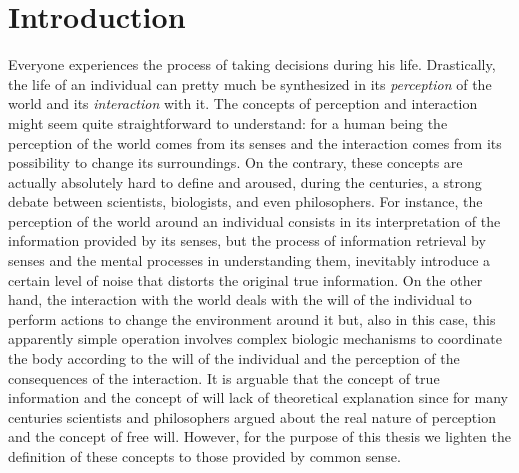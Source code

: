 \chapter{Introduction}
Everyone experiences the process of taking decisions during his life. Drastically, the life of an individual can pretty much be synthesized in its \textit{perception} of the world and its \textit{interaction} with it. The concepts of perception and interaction might seem quite straightforward to understand: for a human being the perception of the world comes from its senses and the interaction comes from its possibility to change its surroundings. On the contrary, these concepts are actually absolutely hard to define and aroused, during the centuries, a strong debate between scientists, biologists, and even philosophers.
For instance, the perception of the world around an individual consists in its interpretation of the information provided by its senses, but the process of information retrieval by senses and the mental processes in understanding them, inevitably introduce a certain level of noise that distorts the original true information. On the other hand, the interaction with the world deals with the will of the individual to perform actions to change the environment around it but, also in this case, this apparently simple operation involves complex biologic mechanisms to coordinate the body according to the will of the individual and the perception of the consequences of the interaction.
It is arguable that the concept of true information and the concept of will lack of theoretical explanation since for many centuries scientists and philosophers argued about the real nature of perception and the concept of free will. However, for the purpose of this thesis we lighten the definition of these concepts to those provided by common sense.
